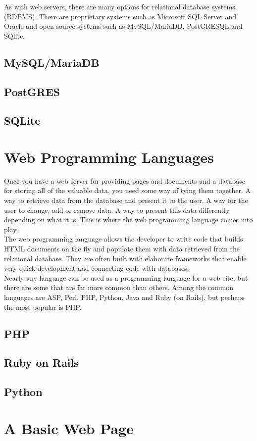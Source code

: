 As with web servers, there are many options for relational database systems (RDBMS).  There are proprietary systems such as Microsoft SQL Server and Oracle and open source systems such as MySQL/MariaDB, PostGRESQL and SQlite.

\subsection{MySQL/MariaDB}

\subsection{PostGRES}

\subsection{SQLite}

\section{Web Programming Languages}

Once you have a web server for providing pages and documents and a database for storing all of the valuable data, you need some way of tying them together.  A way to retrieve data from the database and present it to the user.  A way for the user to change, add or remove data.  A way to present this data differently depending on what it is.  This is where the web programming language comes into play.\\

The web programming language allows the developer to write code that builds HTML documents on the fly and populate them with data retrieved from the relational database.  They are often built with elaborate frameworks that enable very quick development and connecting code with databases.\\

Nearly any language can be used as a programming language for a web site, but there are some that are far more common than others.  Among the common languages are ASP, Perl, PHP, Python, Java and Ruby (on Rails), but perhaps the most popular is PHP.\\

\subsection{PHP}

\subsection{Ruby on Rails}

\subsection{Python}

\section{A Basic Web Page}
